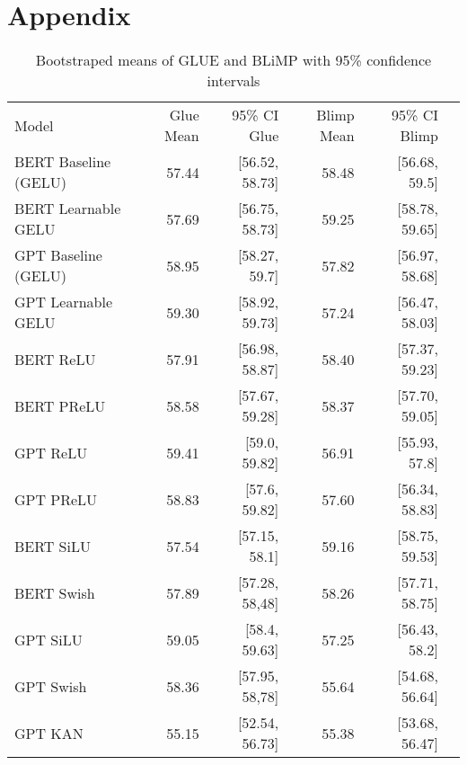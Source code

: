 \newpage
\section{Appendix}
\label{Appendix}

\begin{table}[!htp]\centering
    \caption{Bootstraped means of GLUE and BLiMP with 95\% confidence intervals}
    \label{tab:bootstraped-means }
    \scriptsize
    \begin{tabular}{lrrrrr}\toprule
    Model &Glue Mean &95\% CI Glue &Blimp Mean &95\% CI Blimp \\\cmidrule{1-5}
    BERT Baseline (GELU) &57.44 &[56.52, 58.73] &58.48 &[56.68, 59.5] \\
    BERT Learnable GELU &57.69 &[56.75, 58.73] &59.25 &[58.78, 59.65] \\
    GPT Baseline (GELU) &58.95 &[58.27, 59.7] &57.82 &[56.97, 58.68] \\
    GPT Learnable GELU &59.30 &[58.92, 59.73] &57.24 &[56.47, 58.03] \\
    BERT ReLU &57.91 &[56.98, 58.87] &58.40 &[57.37, 59.23] \\
    BERT PReLU &58.58 &[57.67, 59.28] &58.37 &[57.70, 59.05] \\
    GPT ReLU &59.41 &[59.0, 59.82] &56.91 &[55.93, 57.8] \\
    GPT PReLU &58.83 &[57.6, 59.82] &57.60 &[56.34, 58.83] \\
    BERT SiLU &57.54 &[57.15, 58.1] &59.16 &[58.75, 59.53] \\
    BERT Swish &57.89 &[57.28, 58,48] &58.26 &[57.71, 58.75] \\
    GPT SiLU &59.05 &[58.4, 59.63] &57.25 &[56.43, 58.2] \\
    GPT Swish &58.36 &[57.95, 58,78] &55.64 &[54.68, 56.64] \\
    GPT KAN &55.15 &[52.54, 56.73] &55.38 &[53.68, 56.47] \\
    \bottomrule
    \end{tabular}
\end{table}
    
